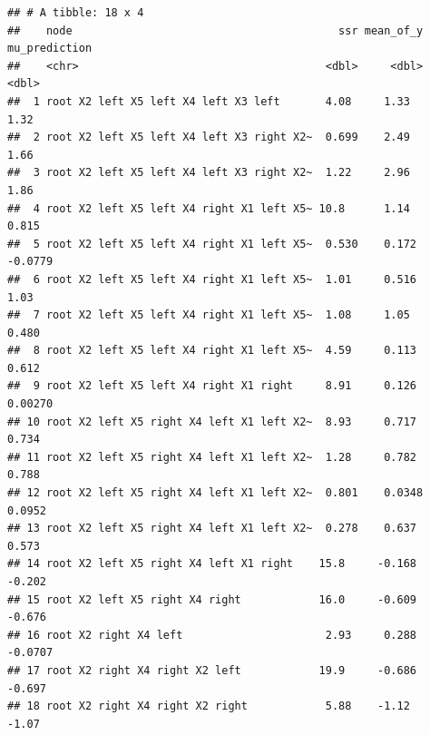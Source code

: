 \documentclass[]{article}
\newenvironment{Shaded}{\begin{snugshade}}{\end{snugshade}}
\newcommand{\CommentTok}[1]{\textcolor[rgb]{0.56,0.35,0.01}{\textit{#1}}}
\newcommand{\DataTypeTok}[1]{\textcolor[rgb]{0.13,0.29,0.53}{#1}}
\newcommand{\DecValTok}[1]{\textcolor[rgb]{0.00,0.00,0.81}{#1}}
\newcommand{\KeywordTok}[1]{\textcolor[rgb]{0.13,0.29,0.53}{\textbf{#1}}}
\newcommand{\NormalTok}[1]{#1}
\newcommand{\OperatorTok}[1]{\textcolor[rgb]{0.81,0.36,0.00}{\textbf{#1}}}
\newcommand{\StringTok}[1]{\textcolor[rgb]{0.31,0.60,0.02}{#1}}
\begin{document}
\begin{Shaded}
\end{Shaded}

\begin{verbatim}
## # A tibble: 18 x 4
##    node                                         ssr mean_of_y mu_prediction
##    <chr>                                      <dbl>     <dbl>         <dbl>
##  1 root X2 left X5 left X4 left X3 left       4.08     1.33         1.32   
##  2 root X2 left X5 left X4 left X3 right X2~  0.699    2.49         1.66   
##  3 root X2 left X5 left X4 left X3 right X2~  1.22     2.96         1.86   
##  4 root X2 left X5 left X4 right X1 left X5~ 10.8      1.14         0.815  
##  5 root X2 left X5 left X4 right X1 left X5~  0.530    0.172       -0.0779 
##  6 root X2 left X5 left X4 right X1 left X5~  1.01     0.516        1.03   
##  7 root X2 left X5 left X4 right X1 left X5~  1.08     1.05         0.480  
##  8 root X2 left X5 left X4 right X1 left X5~  4.59     0.113        0.612  
##  9 root X2 left X5 left X4 right X1 right     8.91     0.126        0.00270
## 10 root X2 left X5 right X4 left X1 left X2~  8.93     0.717        0.734  
## 11 root X2 left X5 right X4 left X1 left X2~  1.28     0.782        0.788  
## 12 root X2 left X5 right X4 left X1 left X2~  0.801    0.0348       0.0952 
## 13 root X2 left X5 right X4 left X1 left X2~  0.278    0.637        0.573  
## 14 root X2 left X5 right X4 left X1 right    15.8     -0.168       -0.202  
## 15 root X2 left X5 right X4 right            16.0     -0.609       -0.676  
## 16 root X2 right X4 left                      2.93     0.288       -0.0707 
## 17 root X2 right X4 right X2 left            19.9     -0.686       -0.697  
## 18 root X2 right X4 right X2 right            5.88    -1.12        -1.07
\end{verbatim}
\end{document}
